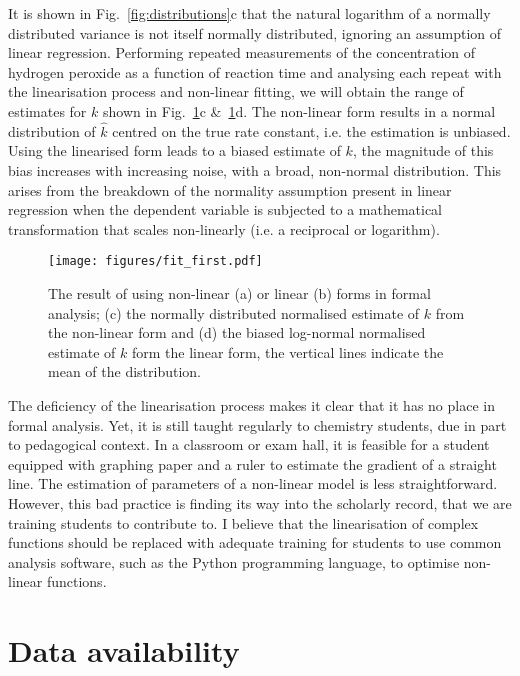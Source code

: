 \documentclass[reprint,superscriptaddress,nobibnotes,amsmath,amssymb]{revtex4-2}
\begin{document}
It is shown in Fig.~\ref{fig:distributions}c that the natural logarithm of a normally distributed variance is not itself normally distributed, ignoring an assumption of linear regression.
Performing repeated measurements of the concentration of hydrogen peroxide as a function of reaction time and analysing each repeat with the linearisation process and non-linear fitting, we will obtain the range of estimates for $k$ shown in Fig.~\ref{fig:fit_first}c \&~\ref{fig:fit_first}d.
The non-linear form results in a normal distribution of $\hat{k}$ centred on the true rate constant, i.e. the estimation is unbiased. 
Using the linearised form leads to a biased estimate of $k$, the magnitude of this bias increases with increasing noise, with a broad, non-normal distribution. 
This arises from the breakdown of the normality assumption present in linear regression when the dependent variable is subjected to a mathematical transformation that scales non-linearly (i.e. a reciprocal or logarithm). 
%
\begin{figure}
  \texttt{[image: figures/fit\_first.pdf]}
  \caption{
    The result of using non-linear (a) or linear (b) forms in formal analysis; (c) the normally distributed normalised estimate of $k$ from the non-linear form and (d) the biased log-normal normalised estimate of $k$ form the linear form, the vertical lines indicate the mean of the distribution. 
    }
  \label{fig:fit_first}
\end{figure}
%

The deficiency of the linearisation process makes it clear that it has no place in formal analysis. 
Yet, it is still taught regularly to chemistry students, due in part to pedagogical context. 
In a classroom or exam hall, it is feasible for a student equipped with graphing paper and a ruler to estimate the gradient of a straight line. 
The estimation of parameters of a non-linear model is less straightforward. 
However, this bad practice is finding its way into the scholarly record, that we are training students to contribute to. 
I believe that the linearisation of complex functions should be replaced with adequate training for students to use common analysis software, such as the Python programming language, to optimise non-linear functions. 

\section*{Data availability}
\end{document}
